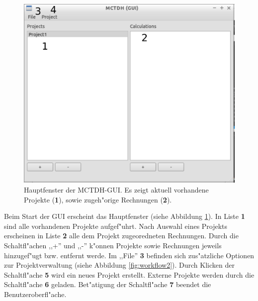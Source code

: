 \begin{figure}
    \centering
    \includegraphics[scale=0.5]{figures/screenMain}
    \caption{Hauptfenster der MCTDH-GUI. Es zeigt aktuell vorhandene Projekte (\textbf{1}), sowie zugeh"orige Rechnungen (\textbf{2}).}\label{fig:workflow1}
\end{figure}

Beim Start der GUI erscheint das Hauptfenster (siehe Abbildung \ref{fig:workflow1}).
In Liste \textbf{1} sind alle vorhandenen Projekte aufgef"uhrt.
Nach Auswahl eines Projekts erscheinen in Liste \textbf{2} alle dem Projekt zugeoredneten Rechnungen.
Durch die Schaltfl"achen ,,+'' und ,,-'' k"onnen Projekte sowie Rechnungen jeweils hinzugef"ugt bzw.
entfernt werde.
Im ,,File'' \textbf{3} befinden sich zus"atzliche Optionen zur Projektverwaltung (siehe Abbildung \ref{fig:workflow2}).
Durch Klicken der Schaltfl"ache \textbf{5} wird ein neues Projekt erstellt. Externe Projekte werden durch die 
Schaltfl"ache \textbf{6} geladen. Bet"atigung der Schaltfl"ache \textbf{7} beendet die Benutzeroberfl"ache.

